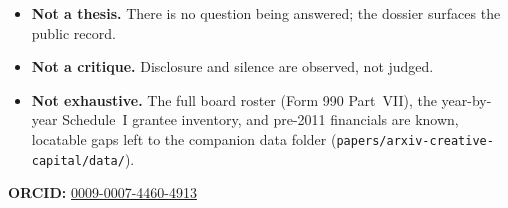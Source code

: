\documentclass[10pt,letterpaper,twocolumn]{article}
\begin{document}
\begin{itemize}
\item \textbf{Not a thesis.} There is no question being answered; the dossier surfaces the public record.
\item \textbf{Not a critique.} Disclosure and silence are observed, not judged.
\item \textbf{Not exhaustive.} The full board roster (Form 990 Part~VII), the year-by-year Schedule~I grantee inventory, and pre-2011 financials are known, locatable gaps left to the companion data folder (\texttt{papers/arxiv-creative-capital/data/}).
\end{itemize}

\vspace{0.5em}
\noindent\textbf{ORCID:} \href{https://orcid.org/0009-0007-4460-4913}{0009-0007-4460-4913}



\end{document}
